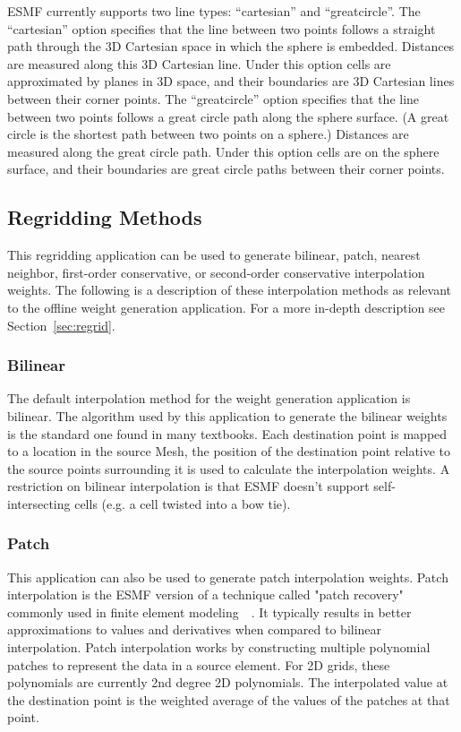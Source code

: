 ESMF currently supports two line types: ``cartesian'' and ``greatcircle''. The ``cartesian'' option 
specifies that the line between two points follows a straight path through the 3D Cartesian space in which the sphere is embedded.
Distances are measured along  this 3D Cartesian line. Under this option cells are approximated by planes in 3D space, and their boundaries are 
3D Cartesian lines between their corner points.  The ``greatcircle'' option specifies that the line between two points follows
a great circle path along the sphere surface. (A great circle is the shortest path between two points on a sphere.) 
Distances are measured along the great circle path. Under this option cells are on the sphere surface, and their boundaries 
are great circle paths between their corner points. 


\subsection{Regridding Methods}\label{sec:rwg_regridmethods}
 This regridding application can be used to generate bilinear, patch, nearest neighbor, first-order conservative, or second-order conservative 
interpolation weights. The following is a description of these interpolation methods as relevant to the offline weight generation application. For a more in-depth description see Section~\ref{sec:regrid}.

\subsubsection{Bilinear}\label{sec:rwg_bilinear}
 The default interpolation method for the weight generation application is bilinear. The algorithm used by this application to 
generate the bilinear weights is the standard one found in many textbooks.  Each destination point is mapped to a location
in the source Mesh, the position of the destination point relative to the source points surrounding it is used to calculate the interpolation weights. A restriction on
bilinear interpolation is that ESMF doesn't support self-intersecting cells (e.g. a cell twisted into a bow tie). 

\subsubsection{Patch}\label{sec:rwg_patch}
This application can also be used to generate patch interpolation weights. Patch
interpolation is the ESMF version of a technique called "patch recovery" commonly
used in finite element modeling~\cite{PatchInterp1}~\cite{PatchInterp2}. It typically results in better approximations to values and derivatives when compared to bilinear interpolation.
Patch interpolation works by constructing multiple polynomial patches to represent
the data in a source element. For 2D grids, these polynomials
are currently 2nd degree 2D polynomials. The interpolated value at the destination point
  is the weighted average of the values of the patches at that point.

